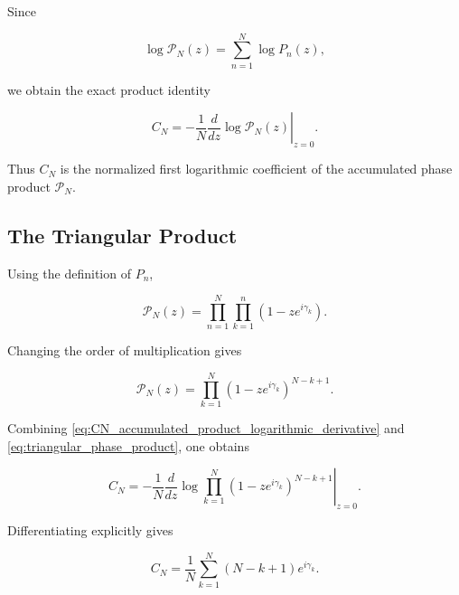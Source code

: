 \documentclass[11pt]{amsart}
\numberwithin{equation}{section}
\theoremstyle{plain}
\theoremstyle{definition}
\theoremstyle{remark}
\begin{document}
Since

\begin{equation}
\log \mathcal{P}_N(z)
=
\sum_{n=1}^{N}
\log P_n(z),
\label{eq:accumulated_phase_product_logarithm}
\end{equation}

we obtain the exact product identity

\begin{equation}
C_N
=
-
\frac{1}{N}
\left.
\frac{d}{dz}
\log \mathcal{P}_N(z)
\right|_{z=0}.
\label{eq:CN_accumulated_product_logarithmic_derivative}
\end{equation}

Thus \(C_N\) is the normalized first logarithmic coefficient of the
accumulated phase product \(\mathcal{P}_N\).

\subsection{The Triangular Product}
\label{subsec:triangular_phase_product}

Using the definition of \(P_n\),

\begin{equation}
\mathcal{P}_N(z)
=
\prod_{n=1}^{N}
\prod_{k=1}^{n}
\left(1-z e^{i\gamma_k}\right).
\label{eq:accumulated_phase_product_double_product}
\end{equation}

Changing the order of multiplication gives

\begin{equation}
\mathcal{P}_N(z)
=
\prod_{k=1}^{N}
\left(1-z e^{i\gamma_k}\right)^{N-k+1}.
\label{eq:triangular_phase_product}
\end{equation}

Combining
\eqref{eq:CN_accumulated_product_logarithmic_derivative}
and
\eqref{eq:triangular_phase_product},
one obtains

\begin{equation}
C_N
=
-
\frac{1}{N}
\left.
\frac{d}{dz}
\log
\prod_{k=1}^{N}
\left(1-z e^{i\gamma_k}\right)^{N-k+1}
\right|_{z=0}.
\label{eq:CN_triangular_product_logarithmic_derivative}
\end{equation}

Differentiating explicitly gives

\begin{equation}
C_N
=
\frac{1}{N}
\sum_{k=1}^{N}
(N-k+1)e^{i\gamma_k}.
\label{eq:CN_triangular_weighted_sum}
\end{equation}
\end{document}
